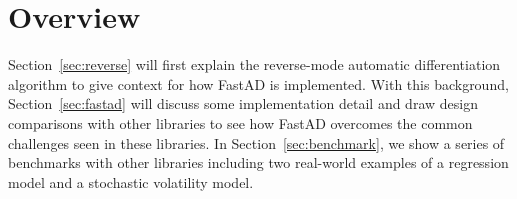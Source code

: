 \section{Overview}

Section~\ref{sec:reverse} will first explain the reverse-mode automatic differentiation algorithm
to give context for how FastAD is implemented.
With this background, Section~\ref{sec:fastad} will discuss some implementation detail
and draw design comparisons with other libraries 
to see how FastAD overcomes the common challenges seen in these libraries.
In Section~\ref{sec:benchmark}, we show a series of benchmarks with
other libraries including two real-world examples 
of a regression model and a stochastic volatility model.
